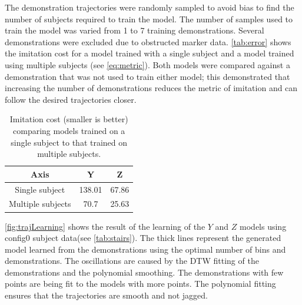 The demonstration trajectories were randomly sampled to avoid bias to find the number of subjects required to train the model. The number of samples used to train the model was varied from 1 to 7 training demonstrations. Several demonstrations were excluded due to obstructed marker data. \autoref{tab:error} shows the imitation cost for a model trained with a single subject and a model trained using multiple subjects (see \autoref{eq:metric}). Both models were compared against a demonstration that was not used to train either model; this demonstrated that increasing the number of demonstrations reduces the metric of imitation and can follow the desired trajectories closer.   


\begin{table}[h]
\large 
     \centering 
     \begin{tabular}{||c|| c c ||}  
     \hline 
         Axis     & Y & Z  \\ [0.5ex]  
         \hline\hline 
         Single subject   & 138.01 & 67.86  \\  
         \hline 
         Multiple subjects & 70.7 & 25.63  \\ 
         \hline      
     \end{tabular} 
     \caption[Stair Imitation Cost]{Imitation cost (smaller is better) comparing models trained on a single subject to that trained on multiple subjects.  } 
     \label{tab:error} 
\end{table} 

\autoref{fig:trajLearning} shows the result of the learning of the $Y$ and $Z$ models using config0 subject data(see \autoref{tab:stairs}). The thick lines represent the generated model learned from the demonstrations using the optimal number of bins and demonstrations. The oscillations are caused by the DTW fitting of the demonstrations and the polynomial smoothing. The demonstrations with few points are being fit to the models with more points. The polynomial fitting ensures that the trajectories are smooth and not jagged.

